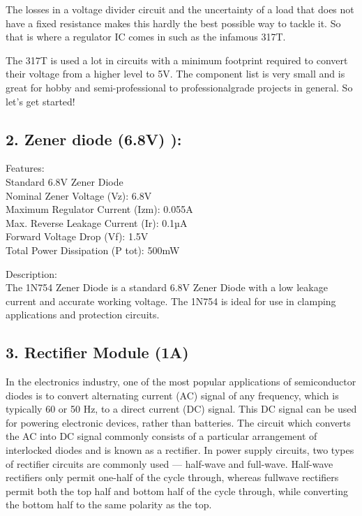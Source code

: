 \documentclass[twocolumn]{article}
\begin{document}
\noindent The losses in a voltage divider circuit and the 
uncertainty of a load that does not have a fixed 
resistance makes this hardly the best possible 
way to tackle it. So that is where a regulator IC 
comes in such as the infamous 317T.

\noindent The 317T is used a lot in circuits with a 
minimum footprint required to convert their 
voltage from a higher level to 5V. The 
component list is very small and is great for 
hobby and semi-professional to professionalgrade projects in general. So let’s get started!


\subsection*{2. Zener diode (6.8V) ):}

Features: \\

\noindent Standard 6.8V Zener Diode \\
Nominal Zener Voltage (Vz): 6.8V \\
Maximum Regulator Current (Izm): 0.055A \\
Max. Reverse Leakage Current (Ir): 0.1µA \\
Forward Voltage Drop (Vf): 1.5V \\
Total Power Dissipation (P tot): 500mW \\
\vspace{5pt}

\noindent Description: \\

\noindent The 1N754 Zener Diode is 
a standard 6.8V Zener 
Diode with a low leakage 
current and accurate 
working voltage. The 1N754 is ideal for use in 
clamping applications and protection circuits.


\subsection*{3. Rectifier Module (1A)}
In the electronics industry, one of the most 
popular applications of semiconductor diodes is 
to convert alternating current (AC) signal of 
any frequency, which is typically 60 or 50 Hz, 
to a direct current (DC) signal. This DC signal 
can be used for powering electronic devices, 
rather than batteries. The circuit which converts 
the AC into DC signal commonly consists of a 
particular arrangement of 
interlocked diodes and is 
known as a rectifier. In 
power supply circuits, 
two types of rectifier 
circuits are commonly 
used — half-wave and 
full-wave. Half-wave 
rectifiers only permit 
one-half of the cycle through, whereas fullwave rectifiers permit both the top half and 
bottom half of the cycle through, while 
converting the bottom half to the same polarity 
as the top.
\end{document}
